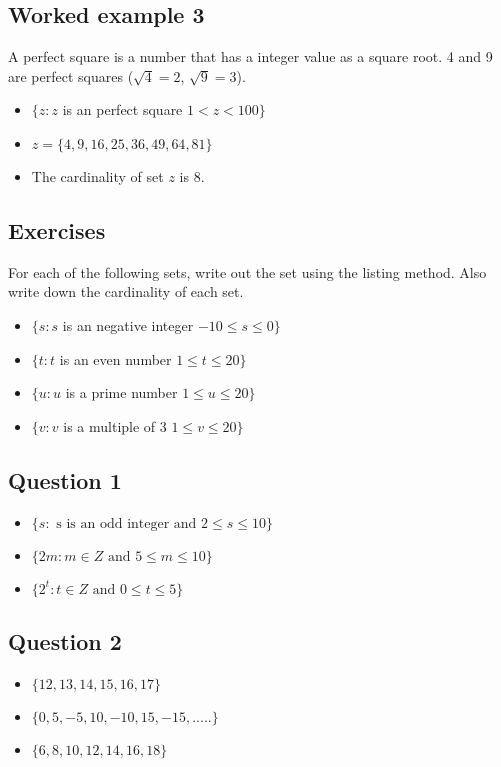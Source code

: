 \documentclass[11pt,a4paper,titlepage,oneside,openany]{article}
\numberwithin{equation}{section}
\numberwithin{algorithm}{section}
\numberwithin{figure}{section}
\numberwithin{table}{section}
\begin{document}
\subsection*{Worked example 3}
A perfect square is a number that has a integer value as a
square root. 4 and 9 are perfect squares ($\sqrt{4} = 2$,
$\sqrt{9} = 3$).
\begin{itemize}
\item $\{ z : z $ is an perfect square $ 1 < z < 100 \}$
\item $z = \{4,9,16,25,36,49,64,81\}$
\item The cardinality of set $z$ is 8.
\end{itemize}

\newpage

\subsection*{Exercises}
For each of the following sets, write out the set using the listing method.
Also write down the cardinality of each set.

\begin{itemize} 
\item $\{ s : s $ is an negative integer $ -10 \leq s \leq 0 \}$
\item $\{ t : t $ is an even number $ 1 \leq t \leq 20 \}$
\item $\{ u : u $ is a prime number $ 1 \leq u \leq 20 \}$
\item $\{ v : v $ is a multiple of 3 $ 1 \leq v \leq 20 \}$
\end{itemize}
\subsection*{Question 1}

\begin{itemize}
	\item $\{ s :  \mbox{ s is an odd integer and } 2 \leq s \leq 10 \}$
	\item $\{ 2m :  m \in Z \mbox{ and }5 \leq m \leq 10 \}$
	\item $\{ 2^t :  t \in Z \mbox{ and } 0 \leq t \leq 5 \}$
\end{itemize}

\subsection*{Question 2}

\begin{itemize}
	\item $\{12,13,14,15,16,17\}$
	\item $\{0,5,-5,10,-10,15,-15,.....\}$
	\item $\{6,8,10,12,14,16,18\}$
\end{itemize}
\end{document}
